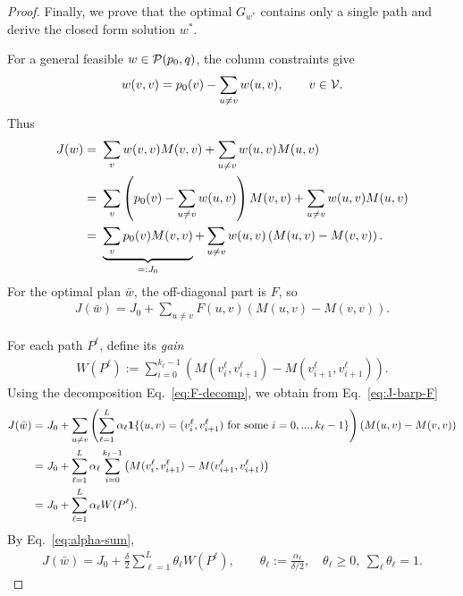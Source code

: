 \begin{proof}
\medskip

Finally, we prove that the optimal $G_{w^*}$ contains only a single path and derive the closed form solution $w^*$.

For a general feasible $w\in\mathcal{P}(p_0,q)$, the column constraints give
\begin{align}
    w(v,v)
    = p_0(v) - \sum_{u\neq v} w(u,v), \qquad v\in\mathcal{V}.
    \label{eq:diag-from-offdiag}
\end{align}
Thus
\begin{align}
    J(w)
    = &~ \sum_{v} w(v,v)M(v,v) + \sum_{u\neq v} w(u,v)M(u,v) \notag\\
    = &~ \sum_v \left(p_0(v)-\sum_{u\neq v}w(u,v)\right)M(v,v)
       +\sum_{u\neq v}w(u,v)M(u,v) \notag\\
    = &~ \underbrace{\sum_v p_0(v)M(v,v)}_{=:J_0}
       + \sum_{u\neq v} w(u,v)\left(M(u,v)-M(v,v)\right).
    \label{eq:J-decomp-general}
\end{align}
For the optimal plan $\bar w$, the off-diagonal part is $F$, so
\begin{align}
    J(\bar w)
    = J_0 + \sum_{u\neq v} F(u,v)\left(M(u,v)-M(v,v)\right).
    \label{eq:J-barp-F}
\end{align}

For each path $P^\ell$, define its \emph{gain}
\begin{align}
    W(P^\ell)
    := \sum_{i=0}^{k_\ell-1}
       \left(
           M(v_i^\ell,v_{i+1}^\ell)
           - M(v_{i+1}^\ell,v_{i+1}^\ell)
       \right).
    \label{eq:path-gain}
\end{align}
Using the decomposition Eq.~\eqref{eq:F-decomp}, we obtain from Eq.~\eqref{eq:J-barp-F}
\begin{align}
    J(\bar w)
    = &~ J_0
       + \sum_{u\neq v}
         \left(
           \sum_{\ell=1}^L \alpha_\ell
           \mathbf{1}\{(u,v)=(v_i^\ell,v_{i+1}^\ell)
                           \text{ for some }i = 0,...,k_\ell-1\}
         \right)
         \left(M(u,v)-M(v,v)\right) \notag\\
    = &~ J_0 + \sum_{\ell=1}^L \alpha_\ell
       \sum_{i=0}^{k_\ell-1}
       \left(
           M(v_i^\ell,v_{i+1}^\ell)
           - M(v_{i+1}^\ell,v_{i+1}^\ell)
       \right) \notag\\
    = &~ J_0 + \sum_{\ell=1}^L \alpha_\ell W(P^\ell).
    \label{eq:J-barp-pathsum}
\end{align}
By Eq.~\eqref{eq:alpha-sum},
\begin{align}
    J(\bar w)
    = J_0 + \frac{\delta}{2} \sum_{\ell=1}^L \theta_\ell W(P^\ell),
    \qquad
    \theta_\ell := \frac{\alpha_\ell}{\delta/2},\quad
    \theta_\ell\ge0,\ \sum_\ell \theta_\ell=1.
    \label{eq:J-barp-convex}
\end{align}


\end{proof}
